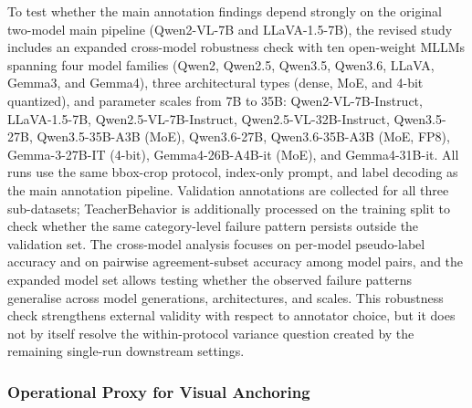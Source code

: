 \documentclass{ieeeaccess}
\begin{document}
To test whether the main annotation findings depend strongly on the
original two-model main pipeline (Qwen2-VL-7B and LLaVA-1.5-7B), the
revised study includes an expanded cross-model robustness check with ten
open-weight MLLMs spanning four model families (Qwen2, Qwen2.5, Qwen3.5,
Qwen3.6, LLaVA, Gemma3, and Gemma4), three architectural types (dense,
MoE, and 4-bit quantized), and parameter scales from 7B to 35B:
Qwen2-VL-7B-Instruct, LLaVA-1.5-7B, Qwen2.5-VL-7B-Instruct,
Qwen2.5-VL-32B-Instruct, Qwen3.5-27B, Qwen3.5-35B-A3B (MoE),
Qwen3.6-27B, Qwen3.6-35B-A3B (MoE, FP8), Gemma-3-27B-IT (4-bit),
Gemma4-26B-A4B-it (MoE), and Gemma4-31B-it.
All runs use the same bbox-crop protocol, index-only prompt, and
label decoding as the main annotation pipeline.
Validation annotations are collected for all three sub-datasets;
TeacherBehavior is additionally processed on the training split to
check whether the same category-level failure pattern persists outside
the validation set.
The cross-model analysis focuses on per-model pseudo-label accuracy and
on pairwise agreement-subset accuracy among model pairs, and the
expanded model set allows testing whether the observed failure patterns
generalise across model generations, architectures, and scales.
This robustness check strengthens external validity with
respect to annotator choice, but it does not by itself resolve the
within-protocol variance question created by the remaining
single-run downstream settings.

\subsubsection{Operational Proxy for Visual Anchoring}
\end{document}
